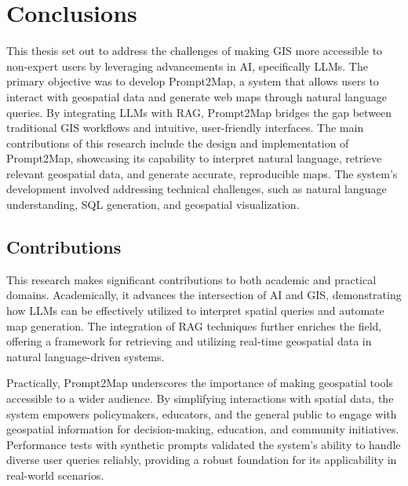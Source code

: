 
%
\chapter{Conclusions}
\label{cha:conclusions}

This thesis set out to address the challenges of making GIS more accessible to non-expert users by leveraging advancements in AI, specifically LLMs. The primary objective was to develop Prompt2Map, a system that allows users to interact with geospatial data and generate web maps through natural language queries. By integrating LLMs with RAG, Prompt2Map bridges the gap between traditional GIS workflows and intuitive, user-friendly interfaces. The main contributions of this research include the design and implementation of Prompt2Map, showcasing its capability to interpret natural language, retrieve relevant geospatial data, and generate accurate, reproducible maps. The system's development involved addressing technical challenges, such as natural language understanding, SQL generation, and geospatial visualization.

\section{Contributions}

This research makes significant contributions to both academic and practical domains. Academically, it advances the intersection of AI and GIS, demonstrating how LLMs can be effectively utilized to interpret spatial queries and automate map generation. The integration of RAG techniques further enriches the field, offering a framework for retrieving and utilizing real-time geospatial data in natural language-driven systems.

Practically, Prompt2Map underscores the importance of making geospatial tools accessible to a wider audience. By simplifying interactions with spatial data, the system empowers policymakers, educators, and the general public to engage with geospatial information for decision-making, education, and community initiatives. Performance tests with synthetic prompts validated the system's ability to handle diverse user queries reliably, providing a robust foundation for its applicability in real-world scenarios.

